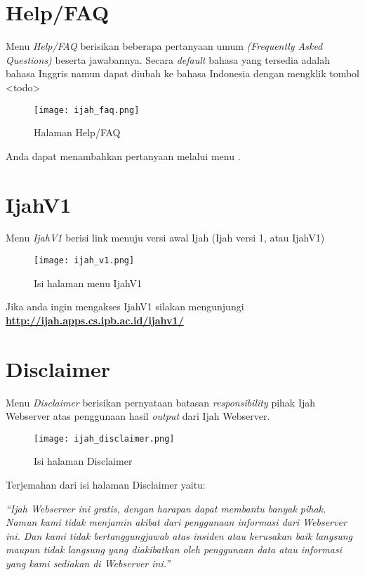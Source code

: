\section{Help/FAQ}
Menu \emph{Help/FAQ} berisikan beberapa pertanyaan umum \emph{(Frequently Asked Questions)} beserta jawabannya. Secara \emph{default} bahasa yang tersedia adalah bahasa Inggris namun dapat diubah ke bahasa Indonesia dengan mengklik tombol <todo>

\begin{figure}[H]
	\centering
	\texttt{[image: ijah\_faq.png]}
	\caption{Halaman Help/FAQ}
	\label{fig:ijah_faq}
\end{figure}

Anda dapat menambahkan pertanyaan melalui menu \textbf{}.

\section{IjahV1}
Menu \emph{IjahV1} berisi link menuju versi awal Ijah (Ijah versi 1, atau IjahV1)

\begin{figure}[H]
	\centering
	\texttt{[image: ijah\_v1.png]}
	\caption{Isi halaman menu IjahV1}
	\label{fig:ijah_v1}
\end{figure}

Jika anda ingin mengakses IjahV1 silakan mengunjungi \href{http://ijah.apps.cs.ipb.ac.id/ijahv1/}{\textbf{http://ijah.apps.cs.ipb.ac.id/ijahv1/}}

\section{Disclaimer}

Menu \emph{Disclaimer} berisikan pernyataan batasan \emph{responsibility} pihak Ijah Webserver atas penggunaan hasil \emph{output} dari Ijah Webserver.

\begin{figure}[H]
	\centering
	\texttt{[image: ijah\_disclaimer.png]}
	\caption{Isi halaman Disclaimer}
	\label{fig:ijah_disclaimer}
\end{figure}

Terjemahan dari isi halaman Disclaimer yaitu:

\textit{``Ijah Webserver ini gratis, dengan harapan dapat membantu banyak pihak. Namun kami tidak menjamin akibat dari penggunaan informasi dari Webserver ini. Dan kami tidak bertanggungjawab atas insiden atau kerusakan baik langsung maupun tidak langsung yang diakibatkan oleh penggunaan data atau informasi yang kami sediakan di Webserver ini.''}


